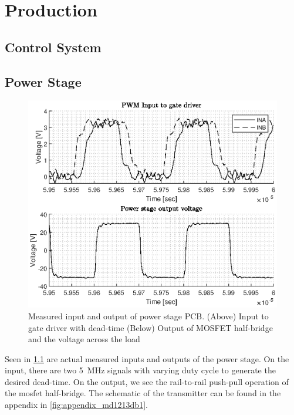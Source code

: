 \chapter{Production}
\section{Control System}

\section{Power Stage}
\begin{figure}[htbp]
	\centering
	\includegraphics[width=.8\textwidth]{Figures/4_transmitter_pcb_out.eps}
	\caption[Measured input and output of power stage PCB]{Measured input and output of power stage PCB. (Above) Input to gate driver with dead-time (Below) Output of MOSFET half-bridge and the voltage across the load}
	\label{fig:4_transmitter_meas}
\end{figure}
Seen in \cref{fig:4_transmitter_meas} are actual measured inputs and outputs of the power stage. On the input, there are two \qty{5}{\mega\hertz} signals with varying duty cycle to generate the desired dead-time. On the output, we see the rail-to-rail push-pull operation of the \gls{mosfet} half-bridge. The schematic of the transmitter can be found in the appendix in \cref{fig:appendix_md1213db1}.
